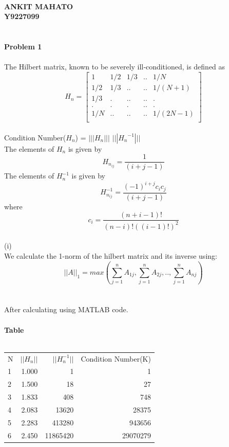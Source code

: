 \documentclass[a4paper,12pt]{article}
\begin{document}
\newcommand{\del}{\nabla}
\textbf{ } \\
\textbf{ANKIT MAHATO} \\
\textbf{Y9227099} \\
\\
\\
\textbf{Problem 1} \\
\\
The Hilbert matrix, known to be severely ill‐conditioned, is defined as \\
\[
H_n =
  \begin{bmatrix}
    1 & 1/2 & 1/3 & .. & 1/N\\
    1/2 & 1/3 & .. & .. & 1/(N+1)\\
    1/3 & . & .. & .. & .\\
    . & . & . & .. & .\\
    1/N & .. & .. & .. & 1/(2N-1)\\
  \end{bmatrix}
\]
\\
Condition Number($H_n$) = $|||H_n|||$ $|||{H_n}^{-1}|||$ \\
The elements of $H_n$ is given by\\
\[ H_{n_{ij}} = \frac{1}{(i + j -1)}  \]
The elements of $H^{-1}_n$ is given by\\
\[ H^{-1}_{n_{ij}} = \frac{(-1)^{i+j} c_i c_j}{(i + j -1)}  \]
where\\
\[ c_i = \frac{(n+i-1)!}{(n-i)!((i-1)!)^2}  \]
\\
(i)\\
We calculate the 1-norm of the hilbert matrix and its inverse using:\\
\[ ||A||_1 = max(\sum_{j=1}^n A_{1j}, \sum_{j=1}^n A_{2j}, .., \sum_{j=1}^n A_{nj}) \] 
\\
\newpage
\textbf{ } \\
After calculating using MATLAB code.\\
\\
\textbf{Table}\\
\\
\begin{tabular}{ l r r r }
 N & $||H_n||$ & $||H^{-1}_n||$ & Condition Number(K)\\
 1 & 1.000 & 1 & 1 \\
 2 & 1.500 & 18 & 27 \\
 3 & 1.833 & 408 & 748 \\
 4 & 2.083 & 13620 & 28375 \\
 5 & 2.283 & 413280 & 943656 \\
 6 & 2.450 & 11865420 & 29070279 \\
\end{tabular}
\end{document}
